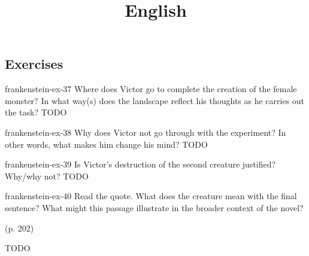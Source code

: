 \documentclass[preview]{standalone}
\begin{document}
\title{English}
\genpage

\subsection{Exercises}

\begin{snippetexercise}{frankenstein-ex-37}
    {Where does Victor go to complete the creation of the female monster? In what way(s) does the
    landscape reflect his thoughts as he carries out the task?}
    TODO 
\end{snippetexercise}

\begin{snippetexercise}{frankenstein-ex-38}
    {Why does Victor not go through with the experiment? In other words, what makes him change
    his mind?}
    TODO 
\end{snippetexercise}

\begin{snippetexercise}{frankenstein-ex-39}
    {Is Victor's destruction of the second creature justified? Why/why not?}
    TODO 
\end{snippetexercise}

\begin{snippetexercise}{frankenstein-ex-40}
    {Read the quote. What does the creature mean with the final sentence? What might this passage
    illustrate in the broader context of the novel?}
    \begin{center}
         (p. 202)
    \end{center}
    TODO 
\end{snippetexercise}
\end{document}
